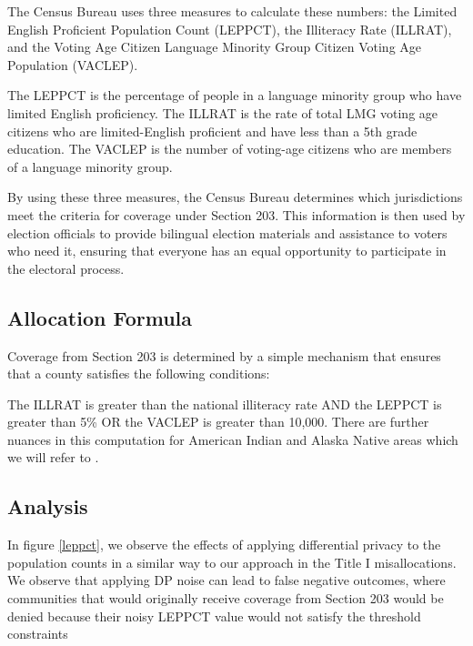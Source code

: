 \documentclass[9pt,lineno,twocolumn,twoside]{pnas-new}
\begin{document}
    The Census Bureau uses three measures to calculate these numbers: the Limited English Proficient Population Count (LEPPCT), the Illiteracy Rate (ILLRAT), and the Voting Age Citizen Language Minority Group Citizen Voting Age Population (VACLEP).

    The LEPPCT is the percentage of people in a language minority group who have limited English proficiency. The ILLRAT is the rate of total LMG voting age citizens who are limited-English proficient and have less than a 5th grade education. The VACLEP is the number of voting-age citizens who are members of a language minority group.

    By using these three measures, the Census Bureau determines which jurisdictions meet the criteria for coverage under Section 203. This information is then used by election officials to provide bilingual election materials and assistance to voters who need it, ensuring that everyone has an equal opportunity to participate in the electoral process.

    \subsection*{Allocation Formula}
    Coverage from Section 203 is determined by a simple mechanism that ensures that a county satisfies the following conditions:

    The ILLRAT is greater than the national illiteracy rate AND the LEPPCT is greater than 5\% OR the VACLEP is greater than 10,000. There are further nuances in this computation for American Indian and Alaska Native areas which we will refer to \cite{Census203}.

    \subsection*{Analysis}
    In figure \ref{leppct}, we observe the effects of applying differential privacy to the population counts in a similar way to our approach in the Title I misallocations. We observe that applying DP noise can lead to false negative outcomes, where communities that would originally receive coverage from Section 203 would be denied because their noisy LEPPCT value would not satisfy the threshold constraints
\end{document}
